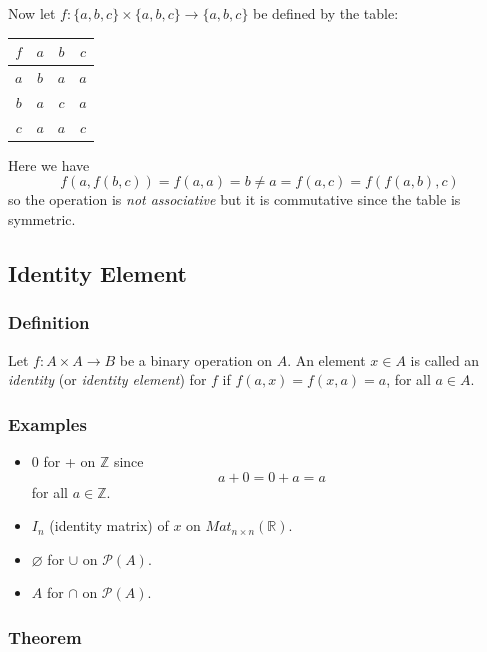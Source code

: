 \documentclass[11pt]{article}
\let\emptyset\varnothing
\begin{document}
    Now let \(f: \{a,b,c\} \times \{a,b,c\} \rightarrow \{a,b,c\}\) be defined by the table:
    \begin{center}
        \begin{tabular}{| c | c | c | c |} \hline
            $f$ & $a$ & $b$ & $c$ \\ \hline
            $a$ & $b$ & $a$ & $a$ \\ \hline
            $b$ & $a$ & $c$ & $a$ \\ \hline
            $c$ & $a$ & $a$ & $c$ \\ \hline
        \end{tabular}
    \end{center}
    Here we have \[f(a,f(b,c)) = f(a,a) = b \neq a = f(a,c) = f(f(a,b),c)\] so the operation is \emph{not associative} but it is commutative since the table is symmetric.

    \subsection{Identity Element}

    \subsubsection{Definition}

    Let \(f: A \times A \rightarrow B\) be a binary operation on $A$. An element \(x \in A\) is called an \emph{identity} (or \emph{identity element}) for $f$ if \(f(a,x) = f(x,a) = a\), for all \(a \in A\).

    \subsubsection{Examples}

    \begin{itemize}
        \item 0 for + on \(\mathbb{Z}\) since \[a + 0 = 0 + a = a\] for all \(a \in \mathbb{Z}\).
        \item \(I_n\) (identity matrix) of $x$ on \(Mat_{n \times n} (\mathbb{R})\).
        \item \(\emptyset\) for \(\cup\) on \(\mathcal{P}(A)\).
        \item $A$ for \(\cap\) on \(\mathcal{P}(A)\).
    \end{itemize}

    \subsubsection{Theorem}
\end{document}
